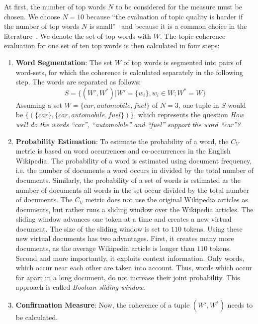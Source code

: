 \documentclass[
        a4paper,
        titlepage,
        twoside,
        parskip,
        numbers=noenddot
        ]{scrbook}
\theoremstyle{break}
\begin{document}
At first, the number of top words $N$ to be considered for the measure must be chosen.
We choose $N=10$ because ``the evaluation of topic quality is harder if the number of top words $N$ is small''~\cite{Roder2015} and because it is a common choice in the literature~\cite{Aletras2013,Roder2015}.
We denote the set of top words with $W$.
The topic coherence evaluation for one set of ten top words is then calculated in four steps:
\begin{enumerate}
  \item \textbf{Word Segmentation}:
    The set $W$ of top words is segmented into pairs of word-sets, for which the coherence is calculated separately in the following step.
    The words are separated as follows:
    \begin{equation*}
      S = \{ (W', W^*) | W' = \{w_i\}, w_i \in W; W^* = W \}
    \end{equation*}
    Assuming a set $W = \{ car, automobile, fuel \}$ of $N = 3$, one tuple in $S$ would be $\{ (\{car\}, \{car, automobile, fuel\})\}$, which represents the question \emph{How well do the words ``car'', ``automobile'' and ``fuel'' support the word ``car''?}
  \item \textbf{Probability Estimation}:
    To estimate the probability of a word, the $C_V$ metric is based on word occurrences and co-occurrences in the English Wikipedia.
    The probability of a word is estimated using document frequency, i.e. the number of documents a word occurs in divided by the total number of documents.
    Similarly, the probability of a set of words is estimated as the number of documents all words in the set occur divided by the total number of documents.
    The $C_V$ metric does not use the original Wikipedia articles as documents, but rather runs a sliding window over the Wikipedia articles.
    The sliding window advances one token at a time and creates a new virtual document.
    The size of the sliding window is set to $110$ tokens.
    Using these new virtual documents has two advantages.
    First, it creates many more documents, as the average Wikipedia article is longer than $110$ tokens.
    Second and more importantly, it exploits context information.
    Only words, which occur near each other are taken into account.
    Thus, words which occur far apart in a long document, do not increase their joint probability.
    This approach is called \emph{Boolean sliding window}.
  \item \textbf{Confirmation Measure}:
    Now, the coherence of a tuple $(W', W^*)$ needs to be calculated.

\end{enumerate}
\end{document}
